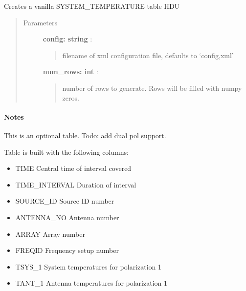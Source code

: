 \documentclass[letterpaper,10pt,english]{sphinxmanual}
\begin{document}
\begin{fulllineitems}
\label{index:pyFitsidi.make_system_temperature}
Creates a vanilla SYSTEM\_TEMPERATURE table HDU
\begin{quote}\begin{description}
\item[{Parameters }] \leavevmode
\textbf{config: string} :
\begin{quote}

filename of xml configuration file, defaults to `config,xml'
\end{quote}

\textbf{num\_rows: int} :
\begin{quote}

number of rows to generate. Rows will be filled with numpy zeros.
\end{quote}

\end{description}\end{quote}
\paragraph{Notes}

This is an optional table.
Todo: add dual pol support.

Table is built with the following columns:
\begin{itemize}
\item {} 
TIME          Central time of interval covered

\item {} 
TIME\_INTERVAL Duration of interval

\item {} 
SOURCE\_ID     Source ID number

\item {} 
ANTENNA\_NO    Antenna number

\item {} 
ARRAY         Array number

\item {} 
FREQID        Frequency setup number

\item {} 
TSYS\_1        System temperatures for polarization 1

\item {} 
TANT\_1        Antenna temperatures for polarization 1

\end{itemize}

\end{fulllineitems}
\end{document}
